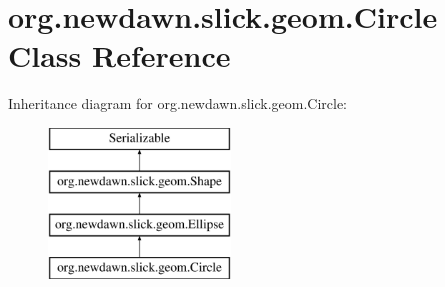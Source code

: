 \hypertarget{classorg_1_1newdawn_1_1slick_1_1geom_1_1_circle}{}\section{org.\+newdawn.\+slick.\+geom.\+Circle Class Reference}
\label{classorg_1_1newdawn_1_1slick_1_1geom_1_1_circle}
Inheritance diagram for org.\+newdawn.\+slick.\+geom.\+Circle\+:\begin{figure}[H]
\begin{center}
\leavevmode
\includegraphics[height=4.000000cm]{classorg_1_1newdawn_1_1slick_1_1geom_1_1_circle}
\end{center}
\end{figure}
